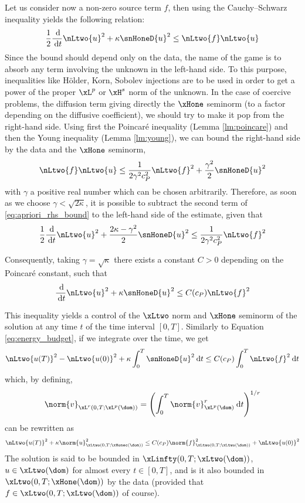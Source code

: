 \medskip
Let us consider now a non-zero source term $f$, then using the Cauchy--Schwarz inequality yields the following relation:
\begin{equation}
\dfrac{1}{2} \ddd{t} \nLtwo{u}^2 + \kappa \snHoneD{u}^2 \leq \nLtwo{f} \nLtwo{u}
\end{equation}
Since the bound should depend only on the data, the name of the game is to absorb any term involving the unknown in the left-hand side.
To this purpose, inequalities like Hölder, Korn, Sobolev injections are to be used in order to get a power of the proper $\xL^p$ or $\xH^s$ norm of the unknown.
In the case of coercive problems, the diffusion term giving directly the $\xHone$ seminorm (to a factor depending on the diffusive coefficient), we should try to make it pop from the right-hand side.
Using first the Poincaré inequality (Lemma \ref{lm:poincare}) and then the Young inequality (Lemma \ref{lm:young}), we can bound the right-hand side by the data and the $\xHone$ seminorm,
\begin{equation}\label{eq:apriori_rhs_bound}
\nLtwo{f} \nLtwo{u} \leq \dfrac{1}{2 \gamma^2 c_P^2} \nLtwo{f}^2 + \dfrac{\gamma^2}{2}\snHoneD{u}^2
\end{equation}
with $\gamma$ a positive real number which can be chosen arbitrarily.
Therefore, as soon as we choose $\gamma < \sqrt{2 \kappa}$, it is possible to subtract the second term of \eqref{eq:apriori_rhs_bound} to the left-hand side of the estimate, given that
\begin{equation}
\dfrac{1}{2} \ddd{t} \nLtwo{u}^2 + \dfrac{2\kappa - \gamma^2}{2}  \snHoneD{u}^2 \leq \dfrac{1}{2 \gamma^2 c_P^2} \nLtwo{f}^2
\end{equation}

Consequently, taking $\gamma= \sqrt{\kappa}$ there exists a constant $C > 0$ depending on the Poincaré constant, such that
\begin{equation}
\ddd{t} \nLtwo{u}^2 + \kappa  \snHoneD{u}^2 \leq C(c_P) \nLtwo{f}^2
\end{equation}

This inequality yields a control of the $\xLtwo$ norm and $\xHone$ seminorm of the solution at any time $t$ of the time interval $[0,T]$.
Similarly to Equation \eqref{eq:energy_budget}, if we integrate over the time, we get
\begin{equation*}
\nLtwo{u(T)}^2 - \nLtwo{u(0)}^2 + \kappa \int_{0}^T \snHoneD{u}^2 \dt \leq C(c_P) \int_{0}^T \nLtwo{f}^2 \dt
\end{equation*}
which, by defining,
\begin{equation}
\norm{v}_{\xL^{r}(0,T;\xL^{p}(\dom))} = \Grp{\int_{0}^T \norm{v}_{\xL^p(\dom)}^{r} \dt}^{1/r}
\end{equation}
can be rewritten as
\begin{equation*}
\nLtwo{u(T)}^2 + \kappa \norm{u}_{\xLtwo(0,T;\xHonec(\dom))}^2 \leq C(c_P) \norm{f}_{\xLtwo(0,T;\xLtwo(\dom))}^2 + \nLtwo{u(0)}^2
\end{equation*}
The solution is said to be bounded in $\xLinfty(0,T;\xLtwo(\dom))$, \ie $u \in \xLtwo(\dom)$ for almost every $t \in [0,T]$, and is it also bounded in $\xLtwo(0,T;\xHone(\dom))$ by the data (provided that $f \in \xLtwo(0,T;\xLtwo(\dom))$ of course).

